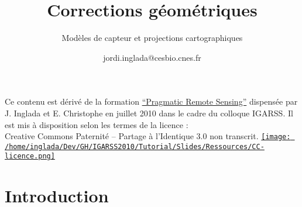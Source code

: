 \documentclass[compress]{beamer}
\title{Corrections géométriques}
\subtitle{Modèles de capteur et projections cartographiques} %
\author
{jordi.inglada@cesbio.cnes.fr}
\institute[Cesbio] %
{\textsc{Centre d'Études Spatiales de la Biosphère, Toulouse, France}}
\date{}
\begin{document}
\begin{frame}
  \titlepage
  \begin{center}
{\tiny Ce contenu est dérivé de la formation \href{http://www.orfeo-toolbox.org/packages/PragmaticRemoteSensing-handout.pdf}{``Pragmatic Remote
  Sensing''} dispensée par J. Inglada et E. Christophe en juillet 2010
  dans le cadre du colloque IGARSS. Il est mis à disposition selon les termes de la licence :\\
Creative Commons Paternité – Partage à l’Identique 3.0 non transcrit.} \href{http://creativecommons.org/licenses/by-sa/3.0/}{\texttt{[image: /home/inglada/Dev/GH/IGARSS2010/Tutorial/Slides/Ressources/CC-licence.png]}}    
  \end{center}
\end{frame}


\section*{Introduction}
\end{document}
